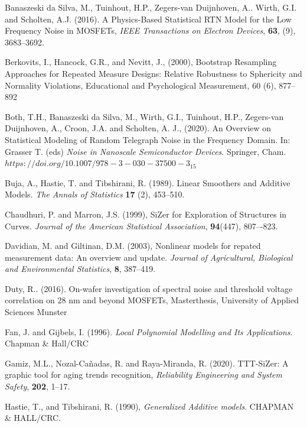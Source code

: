 \documentclass[sn-mathphys]{sn-jnl}%
\theoremstyle{thmstyleone}%
\theoremstyle{thmstyletwo}%
\theoremstyle{thmstylethree}%
\begin{document}
\begin{thebibliography}{00}
	
	 Banaszeski da Silva, M., Tuinhout, H.P., Zegers-van Duijnhoven, A..  Wirth, G.I. and Scholten, A.J. (2016). A Physics-Based Statistical RTN Model for the Low Frequency Noise in MOSFETs,  {\it IEEE Transactions on Electron Devices}, {\bf 63}, (9), 3683--3692.
	
	
	
	 Berkovits, I., Hancock, G.R., and Nevitt, J., (2000), Bootstrap Resampling Approaches for Repeated Measure Designs: Relative Robustness to Sphericity and Normality Violations, Educational and Psychological Measurement,  60 (6), 877--892 
	
	
	 Both, T.H., Banaszeski da Silva, M., Wirth, G.I., Tuinhout, H.P., Zegers-van Duijnhoven, A., Croon, J.A. and Scholten, A. J., (2020). An Overview on Statistical Modeling of Random Telegraph Noise in the Frequency Domain.  In: Grasser T. (eds) {\it Noise in Nanoscale Semiconductor Devices}. Springer, Cham. $https://doi.org/10.1007/978-3-030-37500-3_15$
	
	 Buja, A., Hastie, T. and Tibshirani, R. (1989). Linear Smoothers and Additive Models. {\it The Annals of Statistics} {\bf 17} (2), 453--510.
	
	 Chaudhuri, P. and Marron, J.S. (1999), SiZer for Exploration of Structures in Curves. {\it Journal of the American Statistical Association}, {\bf 94}(447), 807–-823.
	
	 Davidian, M. and Giltinan, D.M. (2003), Nonlinear models for repated measurement data: An overview and update. {\it Journal of Agricultural, Biological and Environmental Statistics}, {\bf 8}, 387--419. 
	
	 Duty, R.. (2016). On-wafer investigation of spectral noise and threshold voltage correlation on 28 nm and beyond MOSFETs, Masterthesis, University of Applied Sciences Munster
	
	  Fan, J. and Gijbels, I. (1996). {\it Local Polynomial Modelling and Its Applications}. Chapman \& Hall/CRC
	
	
	 Gamiz, M.L., Nozal-Ca\~nadas, R. and Raya-Miranda, R. (2020). TTT-SiZer: A graphic tool for aging trends recognition, {\it Reliability Engineering and System Safety}, {\bf 202}, 1--17.
	
	 Hastie, T., and Tibshirani, R. (1990), {\it Generalized Additive models}. CHAPMAN \& HALL/CRC.
	

\end{thebibliography}
\end{document}
